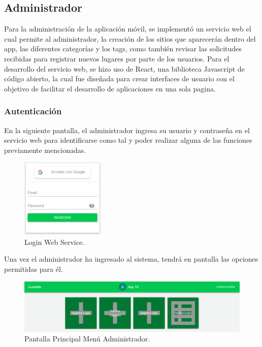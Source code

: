 \documentclass[12pt,letterpaper,openany]{book}
\begin{document}
\subsection{Administrador}
Para la administración de la aplicación móvil, se implementó un servicio web el cual permite al administrador, la creación de los sitios que aparecerán dentro del app, las diferentes categorías y los tags, como también revisar las solicitudes recibidas para registrar nuevos lugares por parte de los usuarios.
\vspace{5mm}\newline
Para el desarrollo del servicio web, se hizo uso de React, una biblioteca Javascript de código abierto, la cual fue diseñada para crear interfaces de usuario con el objetivo de facilitar el desarrollo de aplicaciones en una sola pagina.

\subsubsection{Autenticación}
En la siguiente pantalla, el administrador ingresa su usuario y contraseña en el servicio web para identificarse como tal y poder realizar alguna de las funciones previamente mencionadas.

\begin{figure}[H]
\begin{center}
\includegraphics[width=4cm]{./imagenes/admin/login}
\caption{Login Web Service.}
\end{center}
\end{figure}

Una vez el administrador ha ingresado al sistema, tendrá en pantalla las opciones permitidas para él.

\begin{figure}[H]
\begin{center}
\includegraphics[width=13cm]{./imagenes/admin/p_principal}
\caption{Pantalla Principal Menú Administrador.}
\end{center}
\end{figure}
\end{document}
